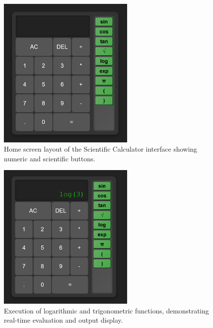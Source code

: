 \documentclass[a4paper,12pt,oneside]{report}
\numberwithin{equation}{chapter}
\numberwithin{figure}{chapter}
\numberwithin{table}{chapter}
\begin{document}
\begin{figure}[H]
    \centering
    \includegraphics[width=0.6\textwidth]{home_calc.png}
    \caption{Home screen layout of the Scientific Calculator interface showing numeric and scientific buttons.}
    \label{fig:CalculatorHome}
\end{figure}

\begin{figure}[H]
    \centering
    \includegraphics[width=0.6\textwidth]{log_calc.png}
    \caption{Execution of logarithmic and trigonometric functions, demonstrating real-time evaluation and output display.}
    \label{fig:CalculatorFunctions}
\end{figure}
\end{document}
